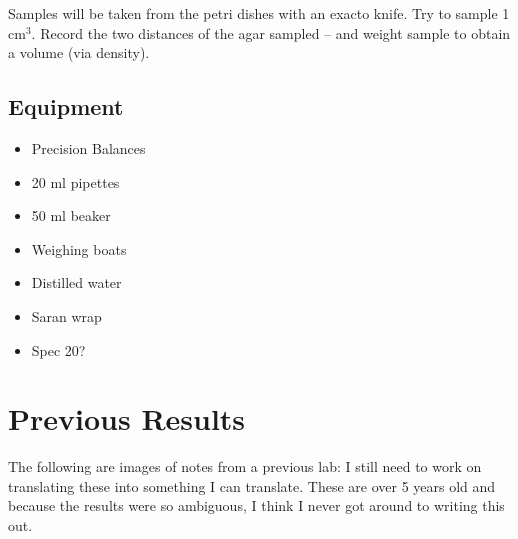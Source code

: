 \documentclass{tufte-handout}
\begin{document}




Samples will be taken from the petri dishes with an exacto knife. Try to sample 1 cm$^3$. Record the two distances of the agar sampled -- and weight sample to obtain a volume (via density).

\subsection{Equipment}
 
\begin{itemize}
	\item Precision Balances
	\item 20 ml pipettes
	\item 50 ml beaker
	\item	Weighing boats
	\item	Distilled water
	\item Saran wrap
	\item Spec 20?
\end{itemize}
	

\section{Previous Results}

The following are images of notes from a previous lab: I still need to work on translating these into something I can translate. These are over 5 years old and because the results were so ambiguous, I think I never got around to writing this out.
\end{document}
